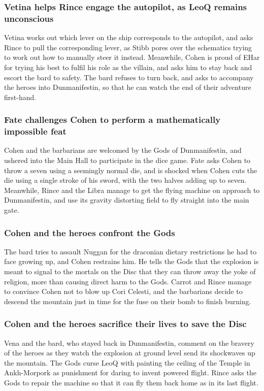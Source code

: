 \subsubsection{\Gls{Vetina} helps \Gls{Rince} engage the autopilot, as \Gls{LeoQ} remains
    unconscious}
\Gls{Vetina} works out which lever on the ship corresponds to the autopilot, and asks \Gls{Rince} to
pull the corresponding lever, as \Gls{Stibb} pores over the schematics trying to work out how to
manually steer it instead. Meanwhile, \Gls{Cohen} is proud of \Gls{EHar} for trying his best to
fulfil his role as the villain, and asks him to stay back and escort the bard to safety. The bard
refuses to turn back, and asks to accompany the heroes into Dunmanifestin, so that he can watch the
end of their adventure first-hand.

\subsubsection{\Gls{Fate} challenges \Gls{Cohen} to perform a mathematically impossible feat}
\Gls{Cohen} and the barbarians are welcomed by the Gods of Dunmanifestin, and ushered into the
Main Hall to participate in the dice game. \Gls{Fate} asks \Gls{Cohen} to throw a seven using a
seemingly normal die, and is shocked when \Gls{Cohen} cuts the die using a single stroke of his
sword, with the two halves adding up to seven. Meanwhile, \Gls{Rince} and the \Gls{Libra} manage
to get the flying machine on approach to Dunmanifestin, and use its gravity distorting field to
fly straight into the main gate.

\subsubsection{\Gls{Cohen} and the heroes confront the Gods}
The bard tries to assault \Gls{Nuggan} for the draconian dietary restrictions he had to face growing
up, and \Gls{Cohen} restrains him. He tells the Gods that the explosion is meant to signal to the
mortals on the Disc that they can throw away the yoke of religion, more than causing direct harm to
the Gods. \Gls{Carrot} and \Gls{Rince} manage to convince \Gls{Cohen} not to blow up Cori Celesti,
and the barbarians decide to descend the mountain just in time for the fuse on their bomb to finish
burning.

\subsubsection{\Gls{Cohen} and the heroes sacrifice their lives to save the Disc}
\Gls{Vena} and the bard, who stayed back in Dunmanifestin, comment on the bravery of the heroes
as they watch the explosion at ground level send its shockwaves up the mountain. The Gods curse
\Gls{LeoQ} with painting the ceiling of the Temple in Ankh-Morpork as punishment for daring to
invent powered flight. \Gls{Rince} asks the Gods to repair the machine so that it can fly them back
home as in its last flight.

